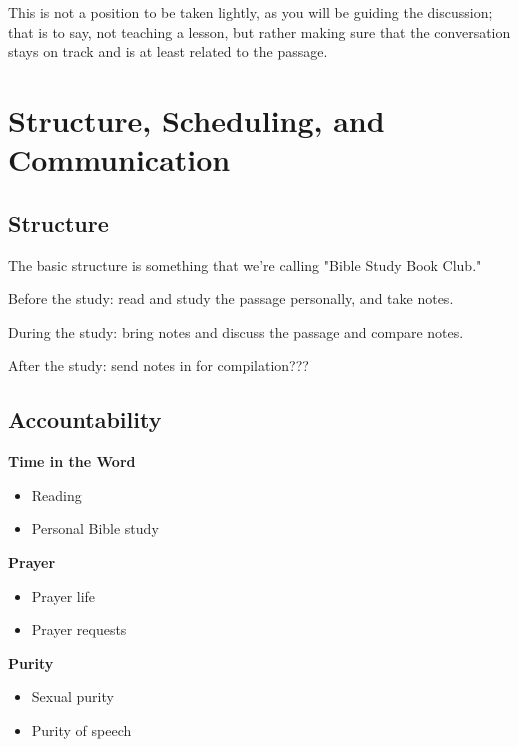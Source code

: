 \documentclass[12pt]{article}
\begin{document}
  This is not a position to be taken lightly, as you will be guiding the
discussion; that is to say, not teaching a lesson, but rather making sure that
the conversation stays on track and is at least related to the passage.

\section{Structure, Scheduling, and Communication}

\subsection{Structure}

The basic structure is something that we're calling "Bible Study Book Club."

Before the study: read and study the passage personally, and take notes.

During the study: bring notes and discuss the passage and compare notes.

After the study: send notes in for compilation???

\subsection{Accountability}

\textbf{Time in the Word}
\begin{itemize}

	\item Reading
	\item Personal Bible study

\end{itemize}

\textbf{Prayer}
\begin{itemize}

	\item Prayer life
	\item Prayer requests

\end{itemize}

\textbf{Purity}
\begin{itemize}

	\item Sexual purity
	\item Purity of speech

\end{itemize}
\end{document}
